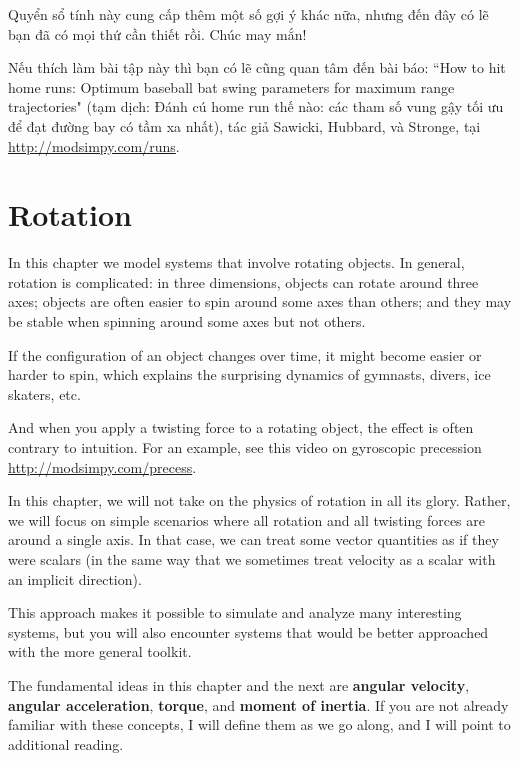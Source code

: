 \documentclass[12pt]{book}
\theoremstyle{exercise}
\begin{document}
Quyển sổ tính này cung cấp thêm một số gợi ý khác nữa, nhưng đến đây có lẽ bạn đã có mọi thứ cần thiết rồi.  Chúc may mắn!

Nếu thích làm bài tập này thì bạn có lẽ cũng quan tâm đến bài báo: ``How to hit home runs: Optimum baseball bat swing parameters for maximum range trajectories" (tạm dịch: Đánh cú home run thế nào: các tham số vung gậy tối ưu để đạt đường bay có tầm xa nhất), tác giả Sawicki, Hubbard, và Stronge, tại \url{http://modsimpy.com/runs}.


\chapter{Rotation}
\label{chap24}

In this chapter we model systems that involve rotating objects.  In general, rotation is complicated:  in three dimensions, objects can rotate around three axes; objects are often easier to spin around some axes than others; and they may be stable when spinning around some axes but not others.


If the configuration of an object changes over time, it might become easier or harder to spin, which explains the surprising dynamics of gymnasts, divers, ice skaters, etc.

And when you apply a twisting force to a rotating object, the effect is often contrary to intuition.  For an example, see this video on gyroscopic precession \url{http://modsimpy.com/precess}.


In this chapter, we will not take on the physics of rotation in all its glory.  Rather, we will focus on simple scenarios where all rotation and all twisting forces are around a single axis.  In that case, we can treat some vector quantities as if they were scalars (in the same way that we sometimes treat velocity as a scalar with an implicit direction).


This approach makes it possible to simulate and analyze many interesting systems, but you will also encounter systems that would be better approached with the more general toolkit.

The fundamental ideas in this chapter and the next are {\bf angular velocity}, {\bf angular acceleration}, {\bf torque}, and {\bf moment of inertia}.  If you are not already familiar with these concepts, I will define them as we go along, and I will point to additional reading.
\end{document}
